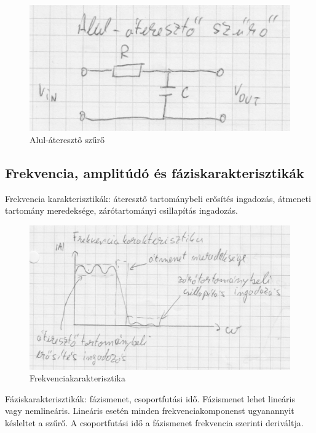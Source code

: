 \begin{figure}[H]
    \centering
    \includegraphics[scale=0.25]{figures/szuro_lp_rc.jpg}
    \caption{Alul-áteresztő szűrő}
\end{figure}

\subsection{Frekvencia, amplitúdó és fáziskarakterisztikák}

Frekvencia karakterisztikák: áteresztő tartománybeli erősítés ingadozás, átmeneti tartomány meredeksége, zárótartományi csillapítás ingadozás.

\begin{figure}[H]
    \centering
    \includegraphics[scale=0.25]{figures/szuro_frekv.jpg}
    \caption{Frekvenciakarakterisztika}
\end{figure}

Fáziskarakterisztikák: fázismenet, csoportfutási idő. Fázismenet lehet lineáris vagy nemlineáris. Lineáris esetén minden frekvenciakomponenst ugyanannyit késleltet a szűrő. A csoportfutási idő a fázismenet frekvencia szerinti deriváltja.

